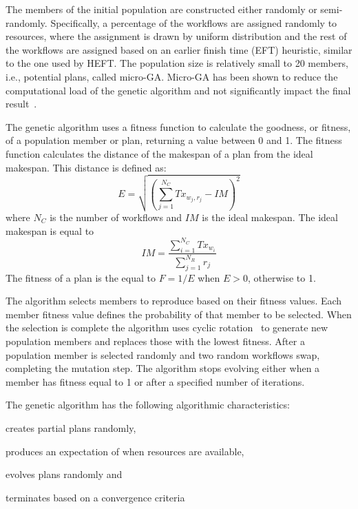 The members of the initial population are constructed either randomly or
semi-randomly. Specifically, a percentage of the workflows are assigned
randomly to resources, where the assignment is drawn by uniform distribution
and the rest of the workflows are assigned based on an earlier finish time
(EFT) heuristic, similar to the one used by HEFT. The population size is
relatively small to 20 members, i.e., potential plans, called micro-GA.
Micro-GA has been shown to reduce the computational load of the genetic
algorithm and not significantly impact the final
result~\cite{zomaya2001observations}.

The genetic algorithm uses a fitness function to calculate the goodness, or
fitness, of a population member or plan, returning a value between 0 and 1.
The fitness function calculates the distance of the makespan of a plan from
the ideal makespan. This distance is defined as:
\begin{equation}
E = \sqrt{(\sum_{j=1}^{N_{C}}Tx_{w_{j},r_{j}} - IM)^2}
\label{eq:fitness}
\end{equation}
where $N_{C}$ is the number of workflows and $IM$ is the ideal makespan. The
ideal makespan is equal to
\begin{equation}
IM = \frac{\sum_{i=1}^{N_{C}}Tx_{w_{i}}}{\sum_{j=1}^{N_{R}}r_{j}}
\label{eq:ideal_fitness}
\end{equation}
The fitness of a plan is the equal to $F = 1 /E$ when $E > 0$, otherwise to 1.

The algorithm selects members to reproduce based on their fitness values. Each
member fitness value defines the probability of that member to be selected.
When the selection is complete the algorithm uses cyclic
rotation~\cite{oliver1987study} to generate new population members and
replaces those with the lowest fitness. After a population member is selected
randomly and two random workflows swap, completing the mutation step. The
algorithm stops evolving either when a member has fitness equal to 1 or after
a specified number of iterations.

The genetic algorithm has the following algorithmic characteristics:
\begin{inparaenum}[1)]
    \item creates partial plans randomly,
    \item produces an expectation of when resources are available,
    \item evolves plans randomly and
    \item terminates based on a convergence criteria
\end{inparaenum}

